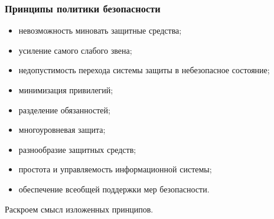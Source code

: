 \begin{frame}
\frametitle{Принципы политики безопасности}
\begin{itemize}
    \item невозможность миновать защитные средства;
    \item усиление самого слабого звена;
    \item недопустимость перехода системы защиты в небезопасное состояние;
    \item минимизация привилегий;
    \item разделение обязанностей;
    \item многоуровневая защита;
    \item разнообразие защитных средств;
    \item простота и управляемость информационной системы;
    \item обеспечение всеобщей поддержки мер безопасности.
\end{itemize}
\end{frame}

Раскроем смысл изложенных принципов.


